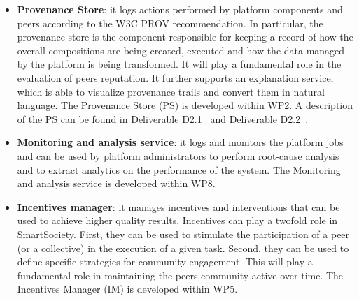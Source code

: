 \begin{itemize}

\item \textbf{Provenance Store}: it logs actions performed by platform
components and peers according to the W3C PROV recommendation. In particular, the provenance store is the component responsible for keeping a record of how the overall compositions are being created, executed and how the data managed by the platform is being transformed. It will play a fundamental role in the evaluation of peers reputation. %
It further supports an explanation service, which is able to visualize provenance trails and convert them in natural language. The Provenance Store (PS) is developed within WP2. A description of the PS can be found in Deliverable D2.1~\cite{d2.1} and Deliverable D2.2~\cite{D2.2}.

\item {\bf Monitoring and analysis service}: it logs and monitors the platform jobs and can be used by platform administrators to perform root-cause analysis and to extract analytics on the performance of the system. The Monitoring and analysis service is developed within WP8.

\item {\bf Incentives manager}: it manages incentives and
interventions that can be used to achieve higher quality results. Incentives can play a twofold role in SmartSociety. First, they can be used to stimulate the participation of a peer (or a collective) in the execution of a given task. Second, they can be used to define specific strategies for community engagement. This will play a fundamental role in maintaining the peers community active over time. The Incentives Manager (IM) is developed within WP5.
\end{itemize} 	



